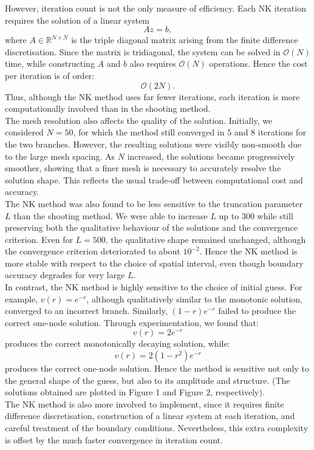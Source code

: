 \documentclass[12pt]{article}
\begin{document}
However, iteration count is not the only measure of efficiency. Each NK iteration requires the solution of a linear system
\[
Az=b,
\]
where $A\in\mathbb{R}^{N\times N}$ is the triple diagonal matrix arising from the finite difference discretisation. Since the matrix is tridiagonal, the system can be solved in $\mathcal{O}(N)$ time, while constructing $A$ and $b$ also requires $\mathcal{O}(N)$ operations. Hence the cost per iteration is of order:
\[
\mathcal{O}(2N).
\]
Thus, although the NK method uses far fewer iterations, each iteration is more computationally involved than in the shooting method.\\

The mesh resolution also affects the quality of the solution. Initially, we considered $N=50$, for which the method still converged in $5$ and $8$ iterations for the two branches. However, the resulting solutions were visibly non-smooth due to the large mesh spacing. As $N$ increased, the solutions became progressively smoother, showing that a finer mesh is necessary to accurately resolve the solution shape. This reflects the usual trade-off between computational cost and accuracy.\\

The NK method was also found to be less sensitive to the truncation parameter $L$ than the shooting method. We were able to increase $L$ up to $300$ while still preserving both the qualitative behaviour of the solutions and the convergence criterion. Even for $L=500$, the qualitative shape remained unchanged, although the convergence criterion deteriorated to about $10^{-2}$. Hence the NK method is more stable with respect to the choice of spatial interval, even though boundary accuracy degrades for very large $L$.\\

In contrast, the NK method is highly sensitive to the choice of initial guess. For example, $v(r)=e^{-r}$, although qualitatively similar to the monotonic solution, converged to an incorrect branch. Similarly, $(1-r)e^{-r}$ failed to produce the correct one-node solution. Through experimentation, we found that:
\[
v(r)=2e^{-r}
\]
produces the correct monotonically decaying solution, while:
\[
v(r)=2(1-r^2)e^{-r}
\]
produces the correct one-node solution. Hence the method is sensitive not only to the general shape of the guess, but also to its amplitude and structure. (The solutions obtained are plotted in Figure 1 and Figure 2, respectively).\\

The NK method is also more involved to implement, since it requires finite difference discretisation, construction of a linear system at each iteration, and careful treatment of the boundary conditions. Nevertheless, this extra complexity is offset by the much faster convergence in iteration count.
\end{document}
